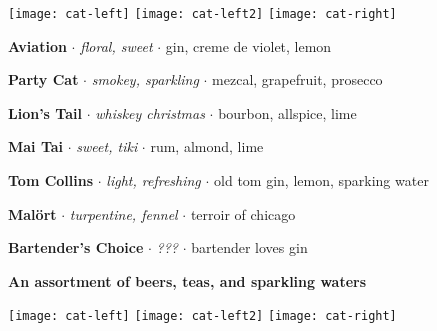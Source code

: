 \documentclass[12pt]{article}
\newcommand*\cats{%
	\par
	\qquad
	\texttt{[image: cat-left]}%
	\hfill
	\texttt{[image: cat-left2]}%
	\hfill
	\texttt{[image: cat-right]}%
	\qquad
	\kern0pt
	\par
}
\newcommand*\separator{ $\cdot$ }
\newcommand*\drink[3]{%
	\par
	\textbf{#1}%
	\separator
	\textit{#2}%
	\separator
	#3%
	\par
}
\begin{document}
\cats
\drink{Aviation}{floral, sweet}{gin, creme de violet, lemon}
\drink{Party Cat}{smokey, sparkling}{mezcal, grapefruit, prosecco}
\drink{Lion's Tail}{whiskey christmas}{bourbon, allspice, lime}
\drink{Mai Tai}{sweet, tiki}{rum, almond, lime}
\drink{Tom Collins}{light, refreshing}{old tom gin, lemon, sparking water}
\drink{Malört}{turpentine, fennel}{terroir of chicago}
\drink{Bartender's Choice}{???}{bartender loves gin}
\textbf{An assortment of beers, teas, and sparkling waters}
\cats
\end{document}
